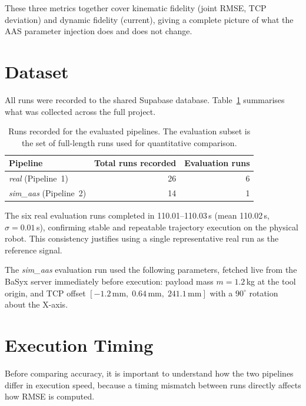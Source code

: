 These three metrics together cover kinematic fidelity (joint RMSE, TCP deviation) and
dynamic fidelity (current), giving a complete picture of what the AAS parameter injection
does and does not change.


\section{Dataset}
\label{sec:eval_dataset}

All runs were recorded to the shared Supabase database. Table~\ref{tab:dataset_overview}
summarises what was collected across the full project.

\begin{table}[htbp]
\centering
\begin{tabular}{lrr}
\toprule
Pipeline                       & Total runs recorded & Evaluation runs \\
\midrule
\textit{real} (Pipeline~1)     & 26                  & 6 \\
\textit{sim\_aas} (Pipeline~2) & 14                  & 1 \\
\bottomrule
\end{tabular}
\caption{Runs recorded for the evaluated pipelines. The evaluation subset is the set of
         full-length runs used for quantitative comparison.}
\label{tab:dataset_overview}
\end{table}

The six real evaluation runs completed in 110.01--110.03\,s (mean 110.02\,s,
$\sigma = 0.01$\,s), confirming stable and repeatable trajectory execution on the physical
robot.
This consistency justifies using a single representative real run as the reference signal.

The \textit{sim\_aas} evaluation run used the following parameters, fetched live from the BaSyx
server immediately before execution: payload mass $m = 1.2$\,kg at the tool origin, and TCP
offset $[-1.2\,\text{mm},\;0.64\,\text{mm},\;241.1\,\text{mm}]$ with a $90^{\circ}$
rotation about the X-axis.


\section{Execution Timing}
\label{sec:timing_analysis}

Before comparing accuracy, it is important to understand how the two pipelines differ in
execution speed, because a timing mismatch between runs directly affects how RMSE is computed.

